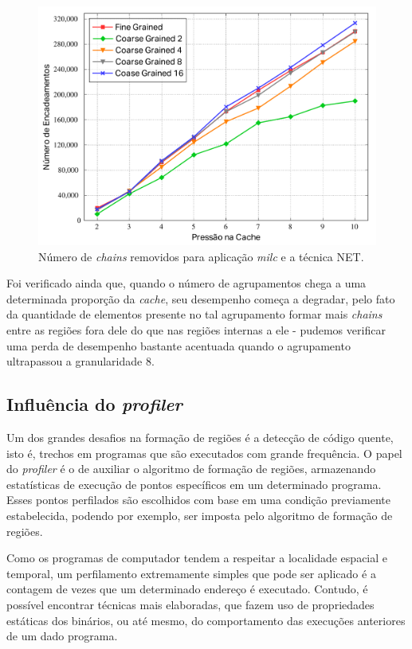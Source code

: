 \documentclass[12pt,twoside]{article}
\newcommand{\cache}{\emph{cache}}
\begin{document}
\begin{figure}[!ht]
\centering
\includegraphics[scale=0.45]{./figs/net-milc-chaining}
\caption{Número de \emph{chains} removidos para aplicação \emph{milc} e a técnica NET.}
\label{fig-milc-chain}
\end{figure}


Foi verificado ainda que, quando o número de agrupamentos chega a uma determinada proporção da \cache, seu desempenho começa a degradar, pelo fato da quantidade de elementos presente no tal agrupamento formar mais \emph{chains} entre as regiões fora dele do que nas regiões internas a ele - pudemos verificar uma perda de desempenho bastante acentuada quando o agrupamento ultrapassou a granularidade $8$.


\subsection{Influência do \emph{profiler}}
Um dos grandes desafios na formação de regiões é a detecção de código quente, isto é, trechos em programas que são executados com grande frequência. O papel do \emph{profiler} é o de auxiliar o algoritmo de formação de regiões, armazenando estatísticas de execução de pontos específicos em um determinado programa. Esses pontos perfilados são escolhidos com base em uma condição previamente estabelecida, podendo por exemplo, ser imposta pelo algoritmo de formação de regiões. 

Como os programas de computador tendem a respeitar a localidade espacial e temporal, um perfilamento extremamente simples que pode ser aplicado é a contagem de vezes que um determinado endereço é executado. Contudo, é possível encontrar técnicas mais elaboradas, que fazem uso de propriedades estáticas dos binários, ou até mesmo, do comportamento das execuções anteriores de um dado programa.
\end{document}
